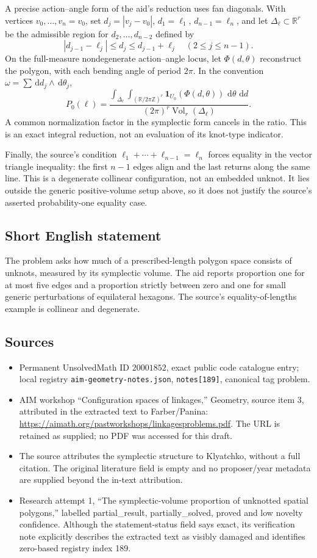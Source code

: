 \documentclass[11pt]{article}
\newcommand{\Z}{\mathbb{Z}}
\newcommand{\R}{\mathbb{R}}
\newcommand{\dd}{\,\mathrm{d}}
\begin{document}
A precise action--angle form of the aid's reduction uses fan diagonals. With vertices \(v_0,\ldots,v_n=v_0\), set \(d_j=|v_j-v_0|\), \(d_1=\ell_1\), \(d_{n-1}=\ell_n\), and let \(\Delta_\ell\subset\R^r\) be the admissible region for \(d_2,\ldots,d_{n-2}\) defined by
\[
 |d_{j-1}-\ell_j|\leq d_j\leq d_{j-1}+\ell_j
 \quad(2\leq j\leq n-1).
\]
On the full-measure nondegenerate action--angle locus, let \(\Phi(d,\theta)\) reconstruct the polygon, with each bending angle of period \(2\pi\). In the convention \(\omega=\sum\dd d_j\wedge\dd\theta_j\),
\[
 P_0(\ell)=\frac{
 \displaystyle\int_{\Delta_\ell}\int_{(\R/2\pi\Z)^r}
 \mathbf1_{U_0}(\Phi(d,\theta))\,\dd\theta\,\dd d}
 {(2\pi)^r\operatorname{Vol}_r(\Delta_\ell)}.
\]
A common normalization factor in the symplectic form cancels in the ratio. This is an exact integral reduction, not an evaluation of its knot-type indicator.

Finally, the source's condition \(\ell_1+\cdots+\ell_{n-1}=\ell_n\) forces equality in the vector triangle inequality: the first \(n-1\) edges align and the last returns along the same line. This is a degenerate collinear configuration, not an embedded unknot. It lies outside the generic positive-volume setup above, so it does not justify the source's asserted probability-one equality case.
\subsection{Short English statement}
The problem asks how much of a prescribed-length polygon space consists of unknots, measured by its symplectic volume. The aid reports proportion one for at most five edges and a proportion strictly between zero and one for small generic perturbations of equilateral hexagons. The source's equality-of-lengths example is collinear and degenerate.
\subsection{Sources}
\begin{itemize}
\item Permanent UnsolvedMath ID \(20001852\), exact public code catalogue entry; local registry \texttt{aim-geometry-notes.json}, \texttt{notes[189]}, canonical tag problem.
\item AIM workshop ``Configuration spaces of linkages,'' Geometry, source item 3, attributed in the extracted text to Farber/Panina: \url{https://aimath.org/pastworkshops/linkagesproblems.pdf}. The URL is retained as supplied; no PDF was accessed for this draft.
\item The source attributes the symplectic structure to Klyatchko, without a full citation. The original literature field is empty and no proposer/year metadata are supplied beyond the in-text attribution.
\item Research attempt 1, ``The symplectic-volume proportion of unknotted spatial polygons,'' labelled partial\_result, partially\_solved, proved and low novelty confidence. Although the statement-status field says exact, its verification note explicitly describes the extracted text as visibly damaged and identifies zero-based registry index 189.
\end{itemize}
\end{document}
